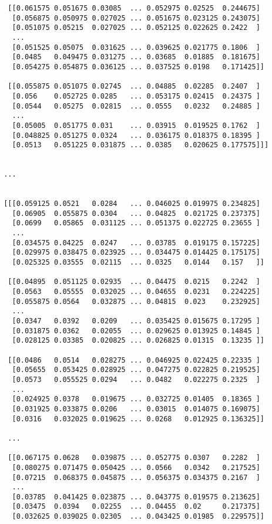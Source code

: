 \documentclass[
  letterpaper,
  DIV=11,
  numbers=noendperiod]{scrreprt}
\begin{document}
\begin{verbatim}
  [[0.061575 0.051675 0.03085  ... 0.052975 0.02525  0.244675]
   [0.056875 0.050975 0.027025 ... 0.051675 0.023125 0.243075]
   [0.051075 0.05215  0.027025 ... 0.052125 0.022625 0.2422  ]
   ...
   [0.051525 0.05075  0.031625 ... 0.039625 0.021775 0.1806  ]
   [0.0485   0.049475 0.031275 ... 0.03685  0.01885  0.181675]
   [0.054275 0.054875 0.036125 ... 0.037525 0.0198   0.171425]]

  [[0.055875 0.051075 0.02745  ... 0.04885  0.02285  0.2407  ]
   [0.056    0.052725 0.0285   ... 0.053175 0.02415  0.24375 ]
   [0.0544   0.05275  0.02815  ... 0.0555   0.0232   0.24885 ]
   ...
   [0.05005  0.051775 0.031    ... 0.03915  0.019525 0.1762  ]
   [0.048825 0.051275 0.0324   ... 0.036175 0.018375 0.18395 ]
   [0.0513   0.051225 0.031875 ... 0.0385   0.020625 0.177575]]]


 ...


 [[[0.059125 0.0521   0.0284   ... 0.046025 0.019975 0.234825]
   [0.06905  0.055875 0.0304   ... 0.04825  0.021725 0.237375]
   [0.0699   0.05865  0.031125 ... 0.051375 0.022725 0.23655 ]
   ...
   [0.034575 0.04225  0.0247   ... 0.03785  0.019175 0.157225]
   [0.029975 0.038475 0.023925 ... 0.034475 0.014425 0.175175]
   [0.025325 0.03555  0.02115  ... 0.0325   0.0144   0.157   ]]

  [[0.04895  0.051125 0.02935  ... 0.04475  0.0215   0.2242  ]
   [0.0563   0.05555  0.032025 ... 0.04655  0.0231   0.224225]
   [0.055875 0.0564   0.032875 ... 0.04815  0.023    0.232925]
   ...
   [0.0347   0.0392   0.0209   ... 0.035425 0.015675 0.17295 ]
   [0.031875 0.0362   0.02055  ... 0.029625 0.013925 0.14845 ]
   [0.028125 0.03385  0.020825 ... 0.026825 0.01315  0.13235 ]]

  [[0.0486   0.0514   0.028275 ... 0.046925 0.022425 0.22335 ]
   [0.05655  0.053425 0.028925 ... 0.047275 0.022825 0.219525]
   [0.0573   0.055525 0.0294   ... 0.0482   0.022275 0.2325  ]
   ...
   [0.024925 0.0378   0.019675 ... 0.032725 0.01405  0.18365 ]
   [0.031925 0.033875 0.0206   ... 0.03015  0.014075 0.169075]
   [0.0316   0.032025 0.019625 ... 0.0268   0.012925 0.136325]]

  ...

  [[0.067175 0.0628   0.039875 ... 0.052775 0.0307   0.2282  ]
   [0.080275 0.071475 0.050425 ... 0.0566   0.0342   0.217525]
   [0.07215  0.068375 0.045875 ... 0.056375 0.034375 0.2167  ]
   ...
   [0.03785  0.041425 0.023875 ... 0.043775 0.019575 0.213625]
   [0.03475  0.0394   0.02255  ... 0.04455  0.02     0.217375]
   [0.032625 0.039025 0.02305  ... 0.043425 0.01985  0.229575]]


\end{verbatim}
\end{document}
